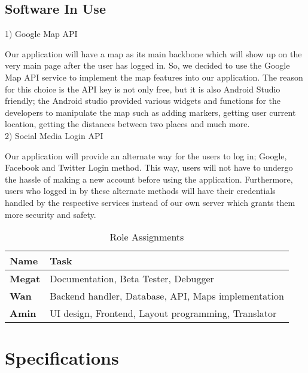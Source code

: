 \documentclass[conference]{IEEEtran}
\begin{document}
\subsection{Software In Use}

1) Google Map API\\

\par Our application will have a map as its main backbone which will show up on the very main page after the user has logged in. So, we decided to use the Google Map API service to implement the map features into our application. The reason for this choice is the API key is not only free, but it is also Android Studio friendly; the Android studio provided various widgets and functions for the developers to manipulate the map such as adding markers, getting user current location, getting the distances between two places and much more.  \\

2) Social Media Login API\\
\par Our application will provide an alternate way for the users to log in; Google, Facebook and Twitter Login method. This way, users will not have to undergo the hassle of making a new account before using the application. Furthermore, users who logged in by these alternate methods will have their credentials handled by the respective services instead of our own server which grants them more security and safety.\\


\begin{table}[htbp]
\caption{Role Assignments}
\begin{center}
\begin{tabular}{ | m{4em} | m{6cm}| } 
  \hline
 \textbf{Name}& \textbf{Task}  \\
\hline
  \textbf{Megat} & Documentation, Beta Tester, Debugger  \\
  \hline
  \textbf{Wan} & Backend handler, Database, API, Maps implementation\\ 
  \hline
  \textbf{Amin} & UI design, Frontend, Layout programming, Translator\\
  \hline
\end{tabular}
\end{center}
\end{table}



\section{Specifications}
\end{document}
